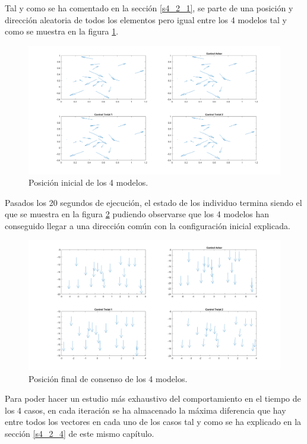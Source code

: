 Tal y como se ha comentado en la sección \ref{s4_2_1}, se parte de una posición y dirección aleatoria de todos los elementos pero igual entre los 4 modelos tal y como se muestra en la figura \ref{fig:pos_inicial_4models}.

\begin{figure}[!h]
    \centering
    \includegraphics[width=\textwidth]{fig/cap04/3ALLB025/pos_inicial.png}
    \caption{Posición inicial de los 4 modelos.}
    \label{fig:pos_inicial_4models}
\end{figure}

Pasados los 20 segundos de ejecución, el estado de los individuo termina siendo el que se muestra en la figura \ref{fig:pos_final_4models} pudiendo observarse que los 4 modelos han conseguido llegar a una dirección común con la configuración inicial explicada.

\begin{figure}[h!]
    \centering
    \includegraphics[width=\textwidth]{fig/cap04/3ALLB025/pos_final.png}
    \caption{Posición final de consenso de los 4 modelos.}
    \label{fig:pos_final_4models}
\end{figure}

Para poder hacer un estudio más exhaustivo del comportamiento en el tiempo de los 4 casos, en cada iteración se ha almacenado la máxima diferencia que hay entre todos los vectores en cada uno de los casos tal y como se ha explicado en la sección \ref{s4_2_4} de este mismo capítulo. 

